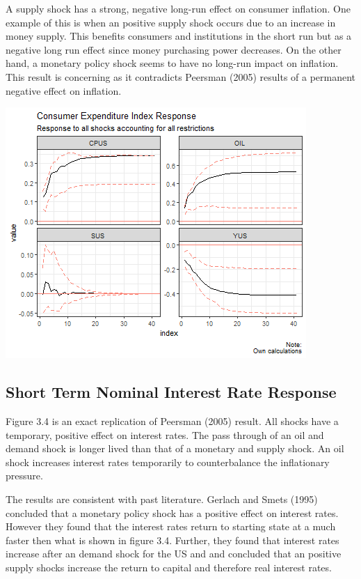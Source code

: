 \documentclass[11pt,preprint, authoryear]{elsarticle}
\let\origfigure\figure
\let\endorigfigure\endfigure
\renewenvironment{figure}[1][2] {
    \expandafter\origfigure\expandafter[H]
} {
    \endorigfigure
}
\numberwithin{equation}{section}
\numberwithin{figure}{section}
\numberwithin{table}{section}
\begin{document}
A supply shock has a strong, negative long-run effect on consumer
inflation. One example of this is when an positive supply shock occurs
due to an increase in money supply. This benefits consumers and
institutions in the short run but as a negative long run effect since
money purchasing power decreases. On the other hand, a monetary policy
shock seems to have no long-run impact on inflation. This result is
concerning as it contradicts Peersman (2005) results of a permanent
negative effect on inflation.

\begin{figure}[H]

{\centering \includegraphics{replication_files/figure-latex/Figure4-1} 

}

\caption{Consumer Expenditure Index\label{Figure4}}\label{fig:Figure4}
\end{figure}

\hypertarget{short-term-nominal-interest-rate-response}{%
\subsection{Short Term Nominal Interest Rate
Response}\label{short-term-nominal-interest-rate-response}}

Figure 3.4 is an exact replication of Peersman (2005) result. All shocks
have a temporary, positive effect on interest rates. The pass through of
an oil and demand shock is longer lived than that of a monetary and
supply shock. An oil shock increases interest rates temporarily to
counterbalance the inflationary pressure.

The results are consistent with past literature. Gerlach and Smets
(1995) concluded that a monetary policy shock has a positive effect on
interest rates. However they found that the interest rates return to
starting state at a much faster then what is shown in figure 3.4.
Further, they found that interest rates increase after an demand shock
for the US and and concluded that an positive supply shocks increase the
return to capital and therefore real interest rates.
\end{document}
